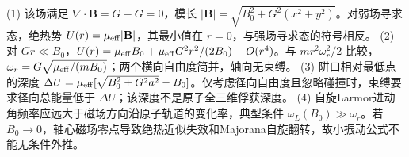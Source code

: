 (1) 该场满足 \(\nabla\cdot\mathbf B=G-G=0\)，模长 \(|\mathbf B|=\sqrt{B_0^2+G^2(x^2+y^2)}\)。对弱场寻求态，绝热势 \(U(r)=\mu_{\rm eff}|\mathbf B|\)，其最小值在 \(r=0\)，与强场寻求态的符号相反。
(2) 对 \(Gr\ll B_0\)，\(U(r)=\mu_{\rm eff}B_0+\mu_{\rm eff}G^2r^2/(2B_0)+O(r^4)\)。与 \(mr^2\omega_r^2/2\) 比较，\(\omega_r=G\sqrt{\mu_{\rm eff}/(mB_0)}\)；两个横向自由度简并，轴向无束缚。
(3) 阱口相对最低点的深度 \(\Delta U=\mu_{\rm eff}[\sqrt{B_0^2+G^2a^2}-B_0]\)。仅考虑径向自由度且忽略碰撞时，束缚要求径向总能量低于 \(\Delta U\)；该深度不是原子全三维俘获深度。
(4) 自旋Larmor进动角频率应远大于磁场方向沿原子轨道的变化率，典型条件 \(\omega_L(B_0)\gg\omega_r\)。若 \(B_0\to0\)，轴心磁场零点导致绝热近似失效和Majorana自旋翻转，故小振动公式不能无条件外推。
